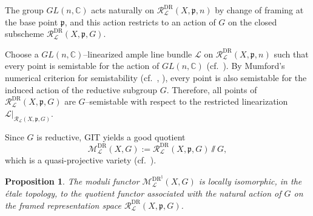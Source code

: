 \documentclass[12pt,reqno]{amsart}
\numberwithin{equation}{subsection}
\newtheorem{proposition}[equation]{Proposition}
\theoremstyle{definition}
\theoremstyle{theorem}
\begin{document}
The group $GL(n,\mathbb{C})$ acts naturally on
$\mathcal{R}^{\text{DR}}_{\mathcal{L}}(X,\mathfrak{p},n)$ by change of framing at the base
point $\mathfrak{p}$, and this action restricts to an action of $G$ on the closed
subscheme $\mathcal{R}^{\text{DR}}_{\mathcal{L}}(X,\mathfrak{p},G)$.

Choose a $GL(n,\mathbb{C})$--linearized ample line bundle
$\mathscr{L}$ on $\mathcal{R}^{\text{DR}}_{\mathcal{L}}(X,\mathfrak{p},n)$ such that every
point is semistable for the action of $GL(n,\mathbb{C})$
(cf.~\cite[\S\,4, Th.~4.10]{CT.Simpson-1994}).
By Mumford’s numerical criterion for semistability
(cf.~\cite[\S\,Ch.~2, Th.~2.1]{D.Mumford-1965},
\cite[\S\,4, Th.~4.2.11]{Huybrechts-Lehn-2010}),
every point is also semistable for the induced action of the reductive subgroup $G$.
Therefore, all points of
$\mathcal{R}^{\text{DR}}_{\mathcal{L}}(X,\mathfrak{p},G)$ are $G$--semistable with respect to the restricted linearization
$\mathscr{L}|_{\mathcal{R}_{\mathcal{L}}(X,\mathfrak{p},G)}$.

Since $G$ is reductive, GIT yields a good quotient
\[
\mathcal{M}^{\text{DR}}_{\mathcal{L}}(X,G)
:=
\mathcal{R}^{\text{DR}}_{\mathcal{L}}(X,\mathfrak{p},G)\sslash G,
\]
which is a quasi-projective variety
(cf.~\cite[\S\,Ch.~1, Th.~1.10]{D.Mumford-1965}).




\begin{proposition}\label{prop:local-quotient-description}
	The moduli functor $\mathcal{M}^{\text{DR}^{\natural}}_{\mathcal{L}}(X,G)$ is locally
	isomorphic, in the étale topology, to the quotient functor associated with the natural action of $G$ on the framed representation space
	$\mathcal{R}^{\text{DR}}_{\mathcal{L}}(X,\mathfrak{p},G)$.
\end{proposition}
\end{document}
